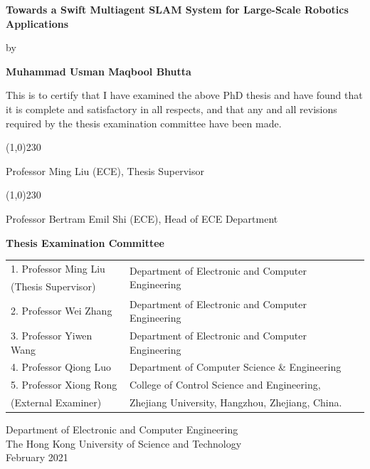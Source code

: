 \null\vspace{0.4cm}
\begin{center}
{\Large\bf Towards a Swift Multiagent SLAM System for Large-Scale Robotics Applications}
\vspace{0.5cm}

{\large by}\smallskip

{\large\bf Muhammad Usman Maqbool Bhutta}\normalsize

\vspace{0.5cm}

This is to certify that I have examined the above PhD thesis and have found that it is complete and satisfactory in all respects, and that any and all revisions required by the thesis examination committee have been made.

\vspace{0.4cm}

\line(1,0){230} 

Professor Ming Liu (ECE), Thesis Supervisor

\vspace{0.4cm}

\line(1,0){230} 

Professor Bertram Emil Shi (ECE), Head of ECE Department

\begin{flushleft}
\textbf{Thesis Examination Committee} \vspace{0.1cm}
\begin{table}[H]
	\renewcommand{\arraystretch}{1.1}
    \begin{tabular}{ll}
	1. Professor Ming Liu & \multirow{2}{*}{Department of Electronic and Computer Engineering}\\
	\quad(Thesis Supervisor) & ~  \\
    2. Professor Wei Zhang & Department of Electronic and Computer Engineering\\
    3. Professor Yiwen Wang & Department of Electronic and Computer Engineering\\
    4. Professor Qiong Luo & Department of Computer Science \& Engineering\\
    5. Professor Xiong Rong & College of Control Science and Engineering,\\
    \quad(External Examiner) & Zhejiang University, Hangzhou, Zhejiang, China. 
    \end{tabular}
\end{table}
\end{flushleft}
Department of Electronic and Computer Engineering \\
The Hong Kong University of Science and Technology \\
February 2021
\end{center}


